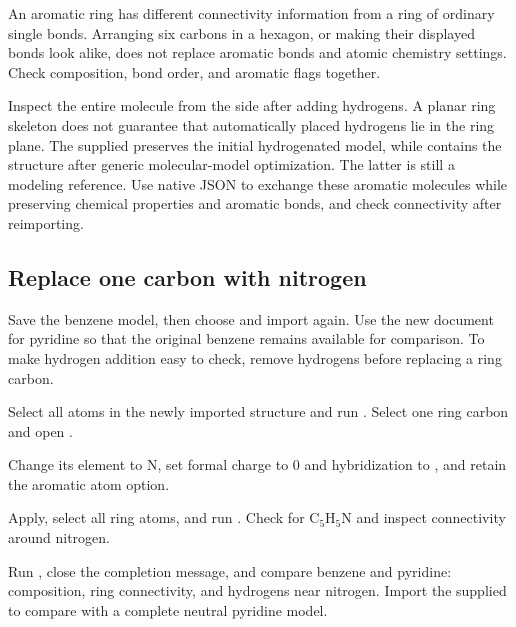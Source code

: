 An aromatic ring has different connectivity information from a ring of ordinary single bonds. Arranging six carbons in a hexagon, or making their displayed bonds look alike, does not replace aromatic bonds and atomic chemistry settings. Check composition, bond order, and aromatic flags together.

Inspect the entire molecule from the side after adding hydrogens. A planar ring skeleton does not guarantee that automatically placed hydrogens lie in the ring plane. The supplied  preserves the initial hydrogenated model, while \mbox{} contains the structure after generic molecular-model optimization. The latter is still a modeling reference. Use native JSON to exchange these aromatic molecules while preserving chemical properties and aromatic bonds, and check connectivity after reimporting.

\subsection{Replace one carbon with nitrogen}

Save the benzene model, then choose  and import  again. Use the new document for pyridine so that the original benzene remains available for comparison. To make hydrogen addition easy to check, remove hydrogens before replacing a ring carbon.

\begin{steps}
  \item Select all atoms in the newly imported structure and run . Select one ring carbon and open .
  \item Change its element to N, set formal charge to 0 and hybridization to , and retain the aromatic atom option.
\end{steps}



\begin{steps}[resume]
  \item Apply, select all ring atoms, and run . Check for $\mathrm{C_5H_5N}$ and inspect connectivity around nitrogen.
  \item Run , close the completion message, and compare benzene and pyridine: composition, ring connectivity, and hydrogens near nitrogen. Import the supplied  to compare with a complete neutral pyridine model.
\end{steps}

